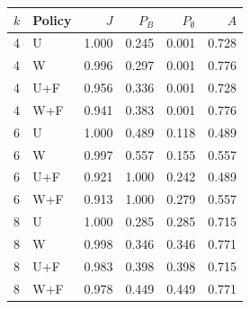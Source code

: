 \begin{tabular}{llrrrr}
\toprule
$k$ & Policy & $J$ & $P_B$ & $P_{\emptyset}$ & $A$ \\
\midrule
4 & U & 1.000 & 0.245 & 0.001 & 0.728 \\
4 & W & 0.996 & 0.297 & 0.001 & 0.776 \\
4 & U+F & 0.956 & 0.336 & 0.001 & 0.728 \\
4 & W+F & 0.941 & 0.383 & 0.001 & 0.776 \\
6 & U & 1.000 & 0.489 & 0.118 & 0.489 \\
6 & W & 0.997 & 0.557 & 0.155 & 0.557 \\
6 & U+F & 0.921 & 1.000 & 0.242 & 0.489 \\
6 & W+F & 0.913 & 1.000 & 0.279 & 0.557 \\
8 & U & 1.000 & 0.285 & 0.285 & 0.715 \\
8 & W & 0.998 & 0.346 & 0.346 & 0.771 \\
8 & U+F & 0.983 & 0.398 & 0.398 & 0.715 \\
8 & W+F & 0.978 & 0.449 & 0.449 & 0.771 \\
\bottomrule
\end{tabular}
